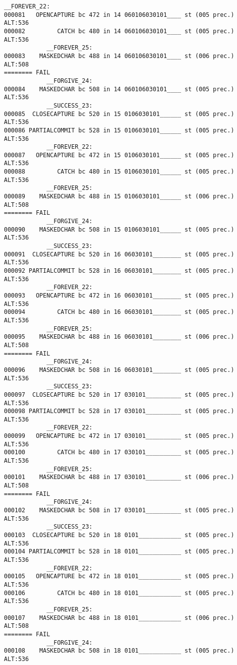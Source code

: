 \begin{changemargin}{-60mm}{0mm}
\begin{myquote}
\begin{Verbatim}[fontsize=\scriptsize]
            __FOREVER_22:
000081   OPENCAPTURE bc 472 in 14 060106030101____ st (005 prec.) ALT:536 
000082         CATCH bc 480 in 14 060106030101____ st (005 prec.) ALT:536 
            __FOREVER_25:
000083    MASKEDCHAR bc 488 in 14 060106030101____ st (006 prec.) ALT:508 
======== FAIL
            __FORGIVE_24:
000084    MASKEDCHAR bc 508 in 14 060106030101____ st (005 prec.) ALT:536 
            __SUCCESS_23:
000085  CLOSECAPTURE bc 520 in 15 0106030101______ st (005 prec.) ALT:536 
000086 PARTIALCOMMIT bc 528 in 15 0106030101______ st (005 prec.) ALT:536 
            __FOREVER_22:
000087   OPENCAPTURE bc 472 in 15 0106030101______ st (005 prec.) ALT:536 
000088         CATCH bc 480 in 15 0106030101______ st (005 prec.) ALT:536 
            __FOREVER_25:
000089    MASKEDCHAR bc 488 in 15 0106030101______ st (006 prec.) ALT:508 
======== FAIL
            __FORGIVE_24:
000090    MASKEDCHAR bc 508 in 15 0106030101______ st (005 prec.) ALT:536 
            __SUCCESS_23:
000091  CLOSECAPTURE bc 520 in 16 06030101________ st (005 prec.) ALT:536 
000092 PARTIALCOMMIT bc 528 in 16 06030101________ st (005 prec.) ALT:536 
            __FOREVER_22:
000093   OPENCAPTURE bc 472 in 16 06030101________ st (005 prec.) ALT:536 
000094         CATCH bc 480 in 16 06030101________ st (005 prec.) ALT:536 
            __FOREVER_25:
000095    MASKEDCHAR bc 488 in 16 06030101________ st (006 prec.) ALT:508 
======== FAIL
            __FORGIVE_24:
000096    MASKEDCHAR bc 508 in 16 06030101________ st (005 prec.) ALT:536 
            __SUCCESS_23:
000097  CLOSECAPTURE bc 520 in 17 030101__________ st (005 prec.) ALT:536 
000098 PARTIALCOMMIT bc 528 in 17 030101__________ st (005 prec.) ALT:536 
            __FOREVER_22:
000099   OPENCAPTURE bc 472 in 17 030101__________ st (005 prec.) ALT:536 
000100         CATCH bc 480 in 17 030101__________ st (005 prec.) ALT:536 
            __FOREVER_25:
000101    MASKEDCHAR bc 488 in 17 030101__________ st (006 prec.) ALT:508 
======== FAIL
            __FORGIVE_24:
000102    MASKEDCHAR bc 508 in 17 030101__________ st (005 prec.) ALT:536 
            __SUCCESS_23:
000103  CLOSECAPTURE bc 520 in 18 0101____________ st (005 prec.) ALT:536 
000104 PARTIALCOMMIT bc 528 in 18 0101____________ st (005 prec.) ALT:536 
            __FOREVER_22:
000105   OPENCAPTURE bc 472 in 18 0101____________ st (005 prec.) ALT:536 
000106         CATCH bc 480 in 18 0101____________ st (005 prec.) ALT:536 
            __FOREVER_25:
000107    MASKEDCHAR bc 488 in 18 0101____________ st (006 prec.) ALT:508 
======== FAIL
            __FORGIVE_24:
000108    MASKEDCHAR bc 508 in 18 0101____________ st (005 prec.) ALT:536 

\end{Verbatim}
\end{myquote}
\end{changemargin}

